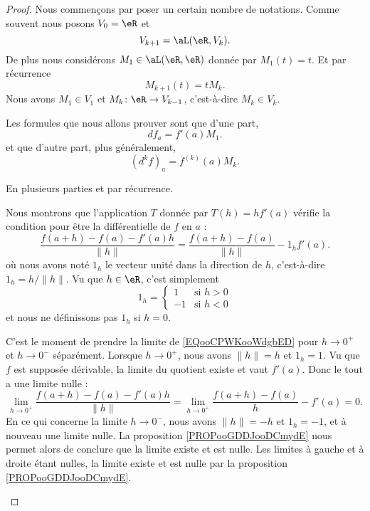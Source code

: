 \begin{proof}
	Nous commençons par poser un certain nombre de notations. Comme souvent nous posons \( V_0=\eR\) et
	\begin{equation}
		V_{k+1}=\aL(\eR,V_k).
	\end{equation}
	De plus nous considérons \( M_1\in \aL(\eR,\eR)\) donnée par \( M_1(t)=t\). Et par récurrence
	\begin{equation}
		M_{k+1}(t)=tM_{k}.
	\end{equation}
	Nous avons \( M_1\in V_1\) et \( M_k\colon \eR\to V_{k-1}\), c'est-à-dire \( M_k\in V_k\).

	Les formules que nous allons prouver sont que d'une part,
	\begin{equation}
		df_a=f'(a)M_1.
	\end{equation}
	et que d'autre part, plus généralement,
	\begin{equation}
		(d^kf)_a=f^{(k)}(a)M_k.
	\end{equation}

	En plusieurs parties et par récurrence.
	\begin{subproof}
		Nous montrons que l'application \( T\) donnée par \( T(h)=hf'(a)\) vérifie la condition pour être la différentielle de \( f\) en \( a\) :
		\begin{equation}        \label{EQooCPWKooWdgbED}
			\frac{ f(a+h)-f(a)-f'(a)h }{ \| h \| }=\frac{ f(a+h)-f(a) }{ \| h \| }-1_hf'(a).
		\end{equation}
		où nous avons noté \( 1_h\) le vecteur unité dans la direction de \( h\), c'est-à-dire \( 1_h=h/\| h \|\). Vu que \( h\in \eR\), c'est simplement
		\begin{equation}
			1_h=\begin{cases}
				1  & \text{si } h>0 \\
				-1 & \text{si }h<0
			\end{cases}
		\end{equation}
		et nous ne définissons pas \( 1_h\) si \( h=0\).

		C'est le moment de prendre la limite de \eqref{EQooCPWKooWdgbED} pour \( h\to 0^+\) et \( h\to 0^-\) séparément. Lorsque \( h\to 0^+\), nous avons \( \| h \|=h\) et \( 1_h=1\). Vu que \( f\) est supposée dérivable, la limite du quotient existe et vaut \( f'(a)\). Donc le tout a une limite nulle :
		\begin{equation}
			\lim_{h\to 0^+} \frac{ f(a+h)-f(a)-f'(a)h }{ \| h \| }=\lim_{h\to 0^+}\frac{ f(a+h)-f(a) }{  h  }-f'(a)=0.
		\end{equation}
		En ce qui concerne la limite \( h\to 0^-\), nous avons \( \| h \|=-h\) et \( 1_h=-1\), et à nouveau une limite nulle. La proposition \ref{PROPooGDDJooDCmydE} nous permet alors de conclure que la limite existe et est nulle. Les limites à gauche et à droite étant nulles, la limite existe et est nulle par la proposition \ref{PROPooGDDJooDCmydE}.


\end{subproof}
\end{proof}
